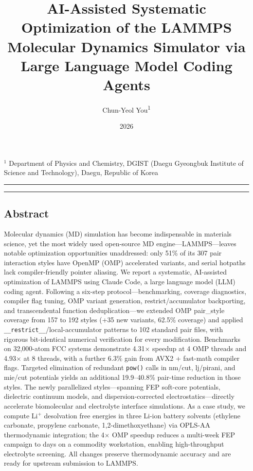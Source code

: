 \documentclass[
  11pt,
]{article}
\title{AI-Assisted Systematic Optimization of the LAMMPS Molecular
Dynamics Simulator via Large Language Model Coding Agents}
\author{Chun-Yeol You\textsuperscript{1}}
\date{2026}
\begin{document}
\maketitle

\(^{1}\) Department of Physics and Chemistry, DGIST (Daegu Gyeongbuk
Institute of Science and Technology), Daegu, Republic of Korea

\begin{center}\rule{0.5\linewidth}{0.5pt}\end{center}

\begin{center}\rule{0.5\linewidth}{0.5pt}\end{center}

\subsection{Abstract}\label{abstract}

Molecular dynamics (MD) simulation has become indispensable in materials
science, yet the most widely used open-source MD
engine---LAMMPS---leaves notable optimization opportunities unaddressed:
only 51\% of its 307 pair interaction styles have OpenMP (OMP)
accelerated variants, and serial hotpaths lack compiler-friendly pointer
aliasing. We report a systematic, AI-assisted optimization of LAMMPS
using Claude Code, a large language model (LLM) coding agent. Following
a six-step protocol---benchmarking, coverage diagnostics, compiler flag
tuning, OMP variant generation, restrict/accumulator backporting, and
transcendental function deduplication---we extended OMP pair\_style
coverage from 157 to 192 styles (+35 new variants, 62.5\% coverage) and
applied \texttt{\_\_restrict\_\_}/local-accumulator patterns to 102
standard pair files, with rigorous bit-identical numerical verification
for every modification. Benchmarks on 32,000-atom FCC systems
demonstrate 4.31\(\times\) speedup at 4 OMP threads and 4.93\(\times\)
at 8 threads, with a further 6.3\% gain from AVX2 + fast-math compiler
flags. Targeted elimination of redundant \texttt{pow()} calls in nm/cut,
lj/pirani, and mie/cut potentials yields an additional 19.9--40.8\%
pair-time reduction in those styles. The newly parallelized
styles---spanning FEP soft-core potentials, dielectric continuum models,
and dispersion-corrected electrostatics---directly accelerate
biomolecular and electrolyte interface simulations. As a case study, we
compute Li\(^{+}\) desolvation free energies in three Li-ion battery
solvents (ethylene carbonate, propylene carbonate, 1,2-dimethoxyethane)
via OPLS-AA thermodynamic integration; the 4\(\times\) OMP speedup
reduces a multi-week FEP campaign to days on a commodity workstation,
enabling high-throughput electrolyte screening. All changes preserve
thermodynamic accuracy and are ready for upstream submission to LAMMPS.
\end{document}
